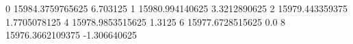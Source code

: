 0 15984.3759765625 6.703125
1 15980.994140625 3.3212890625
2 15979.443359375 1.7705078125
4 15978.9853515625 1.3125
6 15977.6728515625 0.0
8 15976.3662109375 -1.306640625
